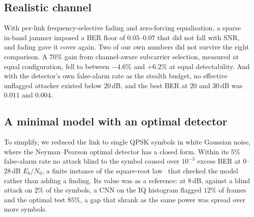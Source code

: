 \subsection{Realistic channel}
With per-link frequency-selective fading and zero-forcing equalisation, a sparse in-band jammer imposed
a BER floor of $0.05$--$0.07$ that did not fall with SNR, and fading gave it cover again.
Two of our own numbers did not survive the right comparison.
A $70\%$ gain from channel-aware subcarrier selection, measured at equal configuration, fell to between
$-4.6\%$ and $+6.2\%$ at equal detectability.
And with the detector's own false-alarm rate as the stealth budget, no effective unflagged attacker
existed below $20$\,dB, and the best BER at $20$ and $30$\,dB was $0.011$ and $0.004$.

\subsection{A minimal model with an optimal detector}\label{sec:exphist-minimal}
To simplify, we reduced the link to single QPSK symbols in white Gaussian noise, where the Neyman--Pearson optimal detector has a closed form.
Within its $5\%$ false-alarm rate no attack blind to the symbol caused over $10^{-3}$ excess BER at $0$--$28$\,dB $E_b/N_0$, a finite instance of the square-root law~\cite{bash2013limits} that checked the model rather than adding a finding.
Its value was as a reference: at $8$\,dB, against a blind attack on $2\%$ of the symbols, a CNN on the IQ histogram flagged $12\%$ of frames and the optimal test $85\%$, a gap that shrank as the same power was spread over more symbols.


